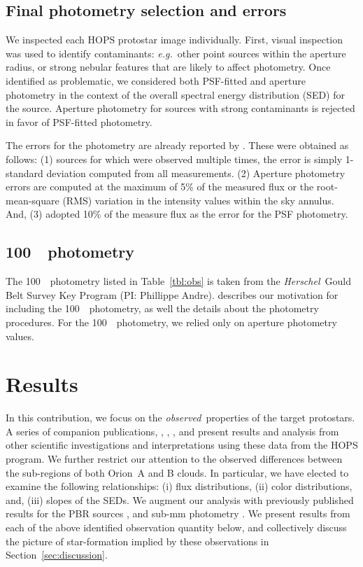 \documentclass[manuscript]{aastex61}
\newcommand{\herschel}{{\em Herschel}}
\begin{document}
\subsection{Final photometry selection and errors}
\label{sec-eyeballs}
We inspected each HOPS protostar image individually.  First, visual inspection was used to identify contaminants: {\it e.g.}\ other point sources within the aperture radius, or strong nebular features that are likely to affect photometry.  Once identified as problematic, we considered both PSF-fitted and aperture photometry in the context of the overall spectral energy distribution (SED) for the source.  Aperture photometry for sources with strong contaminants is rejected in favor of PSF-fitted photometry.
\par
The errors for the photometry are already reported by \cite{furlan}.  These were obtained as follows: (1) sources for which were observed multiple times, the error is simply 1-standard deviation computed from all measurements.  (2) Aperture photometry errors are computed at the maximum of 5\% of the measured flux or the root-mean-square (RMS) variation in the intensity values within the sky annulus.  And, (3) \cite{furlan} adopted 10\% of the measure flux as the error for the PSF photometry.

\subsection{100~\micron\ photometry}
\label{sec:gb100um}
The 100~\micron\ photometry listed in Table~\ref{tbl:obs} is taken from the \herschel\ Gould Belt Survey Key Program (PI: Phillippe Andre).  \cite{pbrpaper} describes our motivation for including the 100~\micron\ photometry, as well the details about the photometry procedures.  For the 100~\micron\ photometry, we relied only on aperture photometry values.

\section{Results}
\label{sec-results}
\par
In this contribution, we focus on the {\em observed}\ properties of the target protostars.  A series of companion publications, \cite{will}, \cite{furlan}, \cite{erin}, and \cite{pbrpaper} present results and analysis from other scientific investigations and interpretations using these data from the HOPS program.   We further restrict our attention to the observed differences between the sub-regions of both Orion~A and B clouds.  In particular, we have elected to examine the following relationships: (i) flux distributions, (ii) color distributions, and, (iii) slopes of the SEDs.  We augment our analysis with previously published results for the PBR sources \cite{pbrpaper}, and sub-mm photometry \citep{thomas}.  We present results from each of the above identified observation quantity below, and collectively discuss the picture of star-formation implied by these observations in Section~\ref{sec:discussion}.
\end{document}
